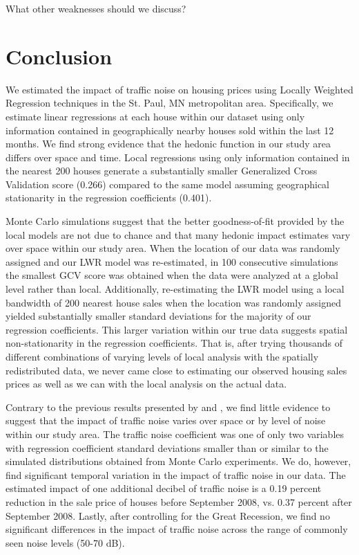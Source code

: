 \documentclass{article}\usepackage{graphicx, color}
\begin{document}
What other weaknesses should we discuss?

\section{Conclusion}

We estimated the impact of traffic noise on housing prices using Locally Weighted Regression techniques in the St. Paul, MN metropolitan area. Specifically, we estimate linear regressions at each house within our dataset using only information contained in geographically nearby houses sold within the last 12 months. We find strong evidence that the hedonic function in our study area differs over space and time. Local regressions using only information contained in the nearest 200 houses generate a substantially smaller Generalized Cross Validation score (0.266) compared to the same model assuming geographical stationarity in the regression coefficients (0.401). 

Monte Carlo simulations suggest that the better goodness-of-fit provided by the local models are not due to chance and that many hedonic impact estimates vary over space within our study area. When the location of our data was randomly assigned and our LWR model was re-estimated, in 100 consecutive simulations the smallest GCV score was  obtained when the data were analyzed at a global level rather than local. Additionally, re-estimating the LWR model using a local bandwidth of 200 nearest house sales when the location was randomly assigned yielded substantially smaller standard deviations for the majority of our regression coefficients. This larger variation within our true data suggests spatial non-stationarity in the regression coefficients. That is, after trying thousands of different combinations of varying levels of local analysis with the spatially redistributed data, we never came close to estimating our observed housing sales prices as well as we can with the local analysis on the actual data. 

Contrary to the previous results presented by \citet{MarmolejoDuarteCarlos;GonzalezTamez2009} and \citet{Theebe2004a}, we find little evidence to suggest that the impact of traffic noise varies over space or by level of noise within our study area. The traffic noise coefficient was one of only two variables with regression coefficient standard deviations smaller than or similar to the simulated distributions obtained from Monte Carlo experiments. We do, however, find significant temporal variation in the impact of traffic noise in our data. The estimated impact of one additional decibel of traffic noise is a 0.19 percent reduction in the sale price of houses before September 2008, vs. 0.37 percent after September 2008. Lastly, after controlling for the Great Recession, we find no significant differences in the impact of traffic noise across the range of commonly seen noise levels (50-70 dB).





\end{document}
